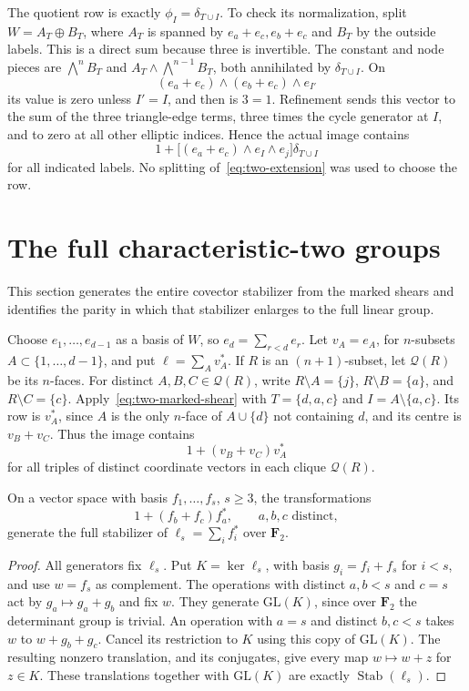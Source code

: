 The quotient row is exactly $\phi_I=\delta_{T\cup I}$. To check its normalization, split $W=A_T\oplus B_T$, where $A_T$ is spanned by $e_a+e_c,e_b+e_c$ and $B_T$ by the outside labels. This is a direct sum because three is invertible. The constant and node pieces are $\bigwedge^nB_T$ and $A_T\wedge\bigwedge^{n-1}B_T$, both annihilated by $\delta_{T\cup I}$. On
\[
(e_a+e_c)\wedge(e_b+e_c)\wedge e_{I'}
\]
its value is zero unless $I'=I$, and then is $3=1$. Refinement sends this vector to the sum of the three triangle-edge terms, three times the cycle generator at $I$, and to zero at all other elliptic indices. Hence the actual image contains
\begin{equation}\label{eq:two-marked-shear}
1+\bigl[(e_a+e_c)\wedge e_I\wedge e_j\bigr]\delta_{T\cup I}
\end{equation}
for all indicated labels. No splitting of~\eqref{eq:two-extension} was used to choose the row.

\section{The full characteristic-two groups}\label{sec:higher-two-group}
This section generates the entire covector stabilizer from the marked shears and identifies the parity in which that stabilizer enlarges to the full linear group.

Choose $e_1,\ldots,e_{d-1}$ as a basis of $W$, so $e_d=\sum_{r<d}e_r$. Let $v_A=e_A$, for $n$-subsets $A\subset\{1,\ldots,d-1\}$, and put $\ell=\sum_Av_A^*$. If $R$ is an $(n+1)$-subset, let $\mathcal Q(R)$ be its $n$-faces. For distinct $A,B,C\in\mathcal Q(R)$, write $R\setminus A=\{j\}$, $R\setminus B=\{a\}$, and $R\setminus C=\{c\}$. Apply~\eqref{eq:two-marked-shear} with $T=\{d,a,c\}$ and $I=A\setminus\{a,c\}$. Its row is $v_A^*$, since $A$ is the only $n$-face of $A\cup\{d\}$ not containing $d$, and its centre is $v_B+v_C$. Thus the image contains
\begin{equation}\label{eq:two-triple-operation}
1+(v_B+v_C)v_A^*
\end{equation}
for all triples of distinct coordinate vectors in each clique $\mathcal Q(R)$.

\begin{lemma}\label{lem:two-triple-stabilizer}
On a vector space with basis $f_1,\ldots,f_s$, $s\ge3$, the transformations
\[
1+(f_b+f_c)f_a^*,\qquad a,b,c\text{ distinct},
\]
generate the full stabilizer of $\ell_s=\sum_i f_i^*$ over $\mathbf F_2$.
\end{lemma}
\begin{proof}
All generators fix $\ell_s$. Put $K=\ker\ell_s$, with basis $g_i=f_i+f_s$ for $i<s$, and use $w=f_s$ as complement. The operations with distinct $a,b<s$ and $c=s$ act by $g_a\mapsto g_a+g_b$ and fix $w$. They generate $\mathrm{GL}(K)$, since over $\mathbf F_2$ the determinant group is trivial. An operation with $a=s$ and distinct $b,c<s$ takes $w$ to $w+g_b+g_c$. Cancel its restriction to $K$ using this copy of $\mathrm{GL}(K)$. The resulting nonzero translation, and its conjugates, give every map $w\mapsto w+z$ for $z\in K$. These translations together with $\mathrm{GL}(K)$ are exactly $\operatorname{Stab}(\ell_s)$.
\end{proof}

